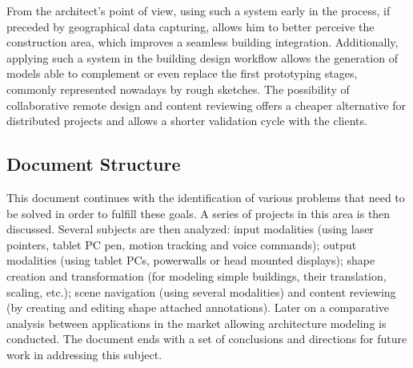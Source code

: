 From the architect's point of view, using such a system early in the process,
if preceded by geographical data capturing,
allows him to better perceive the construction area, which improves a seamless building integration.
Additionally, applying such a system in the building design workflow allows the generation
of models able to complement or even replace the first prototyping stages,
commonly represented nowadays by rough sketches.
The possibility of collaborative remote design and content reviewing offers a cheaper
alternative for distributed projects and allows a shorter validation cycle with the clients.

\subsection{Document Structure}
This document continues with the identification of various problems that need to be solved in order
to fulfill these goals.
A series of projects in this area is then discussed.
Several subjects are then analyzed:
input modalities (using laser pointers, tablet PC pen, motion tracking and voice commands);
output modalities (using tablet PCs, powerwalls or head mounted displays);
shape creation and transformation (for modeling simple buildings, their translation, scaling, etc.);
scene navigation (using several modalities) and
content reviewing (by creating and editing shape attached annotations).
Later on a comparative analysis between applications in the market allowing architecture modeling is conducted.
The document ends with a set of conclusions and directions for future work in
addressing this subject.
